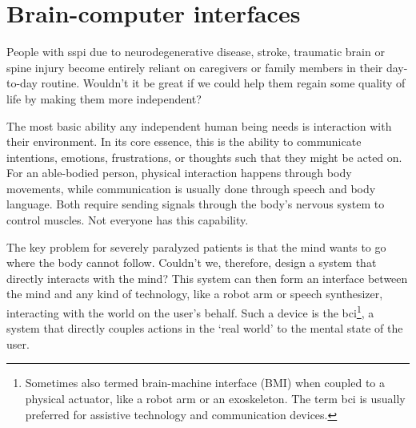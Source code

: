 

\chapter{Brain-computer interfaces}
\label{sec:bci}
People with \ac{sspi} due to neurodegenerative disease, stroke, traumatic brain or spine
injury become entirely reliant on caregivers or family members in their day-to-day
routine.
Wouldn't it be great if we could help them regain some quality of life by making them
more independent?

The most basic ability any independent human being needs is interaction with their
environment.
In its core essence, this is the ability to communicate intentions, emotions,
frustrations, or thoughts such that they might be acted on.
For an able-bodied person, physical interaction happens through body movements, while
communication is usually done through speech and body language.
Both require sending signals through the body's nervous system to control muscles.
Not everyone has this capability.

The key problem for severely paralyzed patients is that the mind wants to go where the
body cannot follow.
Couldn't we, therefore, design a system that directly interacts with the mind?
This system can then form an interface between the mind and any kind of technology, like
a robot arm or speech synthesizer, interacting with the world on the user's behalf.
Such a device is the \ac{bci}\footnote{Sometimes also termed brain-machine interface
(BMI) when coupled to a physical actuator, like a robot arm or an exoskeleton.
The term \ac{bci} is usually preferred for assistive technology and communication
devices.}, a system that directly couples actions in the `real world' to the mental state
of the user.

